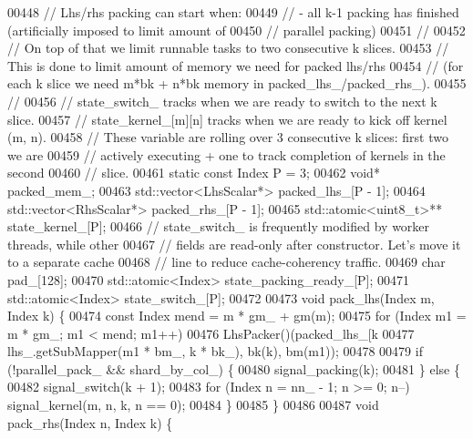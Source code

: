 \begin{DoxyCode}
00448     \textcolor{comment}{// Lhs/rhs packing can start when:}
00449     \textcolor{comment}{//  - all k-1 packing has finished (artificially imposed to limit amount of}
00450     \textcolor{comment}{//  parallel packing)}
00451     \textcolor{comment}{//}
00452     \textcolor{comment}{// On top of that we limit runnable tasks to two consecutive k slices.}
00453     \textcolor{comment}{// This is done to limit amount of memory we need for packed lhs/rhs}
00454     \textcolor{comment}{// (for each k slice we need m*bk + n*bk memory in packed\_lhs\_/packed\_rhs\_).}
00455     \textcolor{comment}{//}
00456     \textcolor{comment}{// state\_switch\_ tracks when we are ready to switch to the next k slice.}
00457     \textcolor{comment}{// state\_kernel\_[m][n] tracks when we are ready to kick off kernel (m, n).}
00458     \textcolor{comment}{// These variable are rolling over 3 consecutive k slices: first two we are}
00459     \textcolor{comment}{// actively executing + one to track completion of kernels in the second}
00460     \textcolor{comment}{// slice.}
00461     \textcolor{keyword}{static} \textcolor{keyword}{const} Index P = 3;
00462     \textcolor{keywordtype}{void}* packed\_mem\_;
00463     std::vector<LhsScalar*> packed\_lhs\_[P - 1];
00464     std::vector<RhsScalar*> packed\_rhs\_[P - 1];
00465     std::atomic<uint8\_t>** state\_kernel\_[P];
00466     \textcolor{comment}{// state\_switch\_ is frequently modified by worker threads, while other}
00467     \textcolor{comment}{// fields are read-only after constructor. Let's move it to a separate cache}
00468     \textcolor{comment}{// line to reduce cache-coherency traffic.}
00469     \textcolor{keywordtype}{char} pad\_[128];
00470     std::atomic<Index> state\_packing\_ready\_[P];
00471     std::atomic<Index> state\_switch\_[P];
00472 
00473     \textcolor{keywordtype}{void} pack\_lhs(Index m, Index k) \{
00474       \textcolor{keyword}{const} Index mend = m * gm\_ + gm(m);
00475       \textcolor{keywordflow}{for} (Index m1 = m * gm\_; m1 < mend; m1++)
00476         LhsPacker()(packed\_lhs\_[k %
00477                     lhs\_.getSubMapper(m1 * bm\_, k * bk\_), bk(k), bm(m1));
00478 
00479       \textcolor{keywordflow}{if} (!parallel\_pack\_ && shard\_by\_col\_) \{
00480         signal\_packing(k);
00481       \} \textcolor{keywordflow}{else} \{
00482         signal\_switch(k + 1);
00483         \textcolor{keywordflow}{for} (Index n = nn\_ - 1; n >= 0; n--) signal\_kernel(m, n, k, n == 0);
00484       \}
00485     \}
00486 
00487     \textcolor{keywordtype}{void} pack\_rhs(Index n, Index k) \{

\end{DoxyCode}

